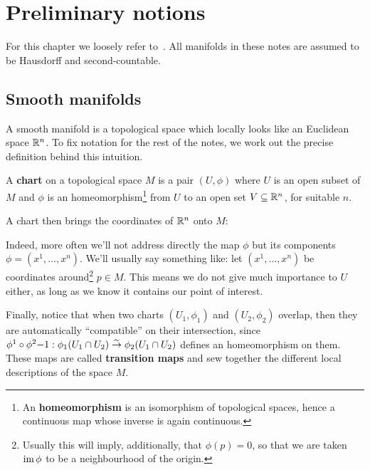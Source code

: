 \chapter{Preliminary notions}
For this chapter we loosely refer to~\cite{abate2011geometria}. All manifolds in these notes are assumed to be Hausdorff and second-countable.

\section{Smooth manifolds}
A smooth manifold is a topological space which locally looks like an Euclidean space $\mathbb{R}^n$. To fix notation for the rest of the notes, we work out the precise definition behind this intuition.

\begin{definition}
	A \textbf{chart} on a topological space $M$ is a pair $(U, \phi)$ where $U$ is an open subset of $M$ and $\phi$ is an homeomorphism\footnote{An \textbf{homeomorphism} is an isomorphism of topological spaces, hence a continuous map whose inverse is again continuous.} from $U$ to an open set $V \subseteq \mathbb{R}^n$, for suitable $n$.
\end{definition}

A chart then brings the coordinates of $\mathbb{R}^n$ onto $M$:

\begin{figure}[H]
	\centering
\end{figure}

Indeed, more often we'll not address directly the map $\phi$ but its components $\phi = (x^1, \ldots, x^n)$. We'll usually say something like: let $(x^1, \ldots, x^n)$ be coordinates around\footnote{Usually this will imply, additionally, that $\phi(p) = 0$, so that we are taken $\operatorname{im} \phi$ to be a neighbourhood of the origin.} $p \in M$. This means we do not give much importance to $U$ either, as long as we know it contains our point of interest.

Finally, notice that when two charts $(U_1, \phi_1)$ and $(U_2, \phi_2)$ overlap, then they are automatically ``compatible'' on their intersection, since $\phi^1 \circ \phi^2{-1} : \phi_1(U_1 \cap U_2) \overset{\sim}\to \phi_2(U_1 \cap U_2)$ defines an homeomorphism on them. These maps are called \textbf{transition maps} and sew together the different local descriptions of the space $M$.

